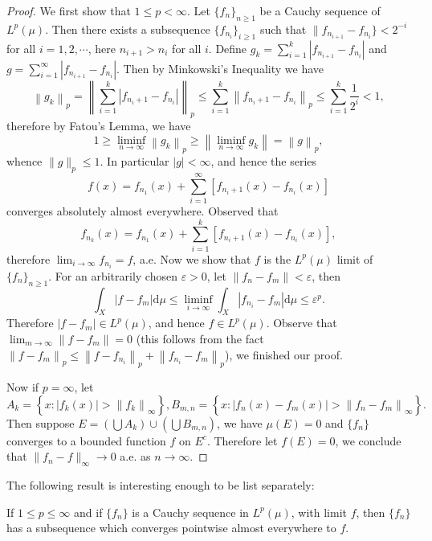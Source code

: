 \begin{proof}
We first show that $1\le p<\infty$. Let $\{f_n\}_{n\ge 1}$ be a Cauchy sequence of $L^p(\mu)$. Then there exists a subsequence $\{f_{n_i}\}_{i\ge 1}$ such that $\|f_{n_{i+1}}-f_{n_i}\}<2^{-i}$ for all $i=1,2,\cdots$, here $n_{i+1}>n_i$ for all $i$. Define $g_k=\sum_{i=1}^k|f_{n_{i+1}}-f_{n_i}|$ and $g=\sum_{i=1}^\infty|f_{n_{i+1}}-f_{n_i}|$. Then by Minkowski's Inequality we have 
$$
\left\| g_k \right\| _p=\left\| \sum_{i=1}^k{\left| f_{n_i+1}-f_{n_i} \right|} \right\| _p\le \sum_{i=1}^k{\left\| f_{n_i+1}-f_{n_i} \right\| _p}\le \sum_{i=1}^k{\frac{1}{2^i}}<1,
$$
therefore by Fatou's Lemma, we have 
$$
1\ge \mathop {\lim\mathrm{inf}} \limits_{n\rightarrow \infty}\left\| g_k \right\| _p\ge \left\| \mathop {\lim\mathrm{inf}} \limits_{n\rightarrow \infty}g_k \right\| =\left\| g \right\| _p,
$$
whence $\|g\|_p\le 1$. In particular $|g|<\infty$, and hence the series 
$$
f\left( x \right) =f_{n_1}\left( x \right) +\sum_{i=1}^{\infty}{\left[ f_{n_i+1}\left( x \right) -f_{n_i}\left( x \right) \right]}
$$
converges absolutely almost everywhere. Observed that 
$$
f_{n_k}\left( x \right) =f_{n_1}\left( x \right) +\sum_{i=1}^k{\left[ f_{n_i+1}\left( x \right) -f_{n_i}\left( x \right) \right]},
$$
therefore $\lim_{i\to\infty}f_{n_i}=f$, a.e. Now we show that $f$ is the $L^p(\mu)$ limit of $\{f_n\}_{n\ge 1}$. For an arbitrarily chosen $\varepsilon>0$, let $\|f_n-f_m\|<\varepsilon$, then 
$$
\int_X{\left| f-f_m \right|\mathrm{d}\mu}\le \mathop {\lim\mathrm{inf}} \limits_{i\rightarrow \infty}\int_X{\left| f_{n_i}-f_m \right|\mathrm{d}\mu}\le \varepsilon ^p.
$$
Therefore $|f-f_m|\in L^p(\mu)$, and hence $f\in L^p(\mu)$. Observe that $\lim_{m\rightarrow \infty} \left\| f-f_m \right\| =0$ (this follows from the fact $\left\| f-f_m \right\|_p \le \left\| f-f_{n_i} \right\|_p +\left\| f_{n_i}-f_m \right\|_p $), we finished our proof.\par
Now if $p=\infty$, let 
$$
A_k=\left\{ x:\left| f_k\left( x \right) \right|>\left\| f_k \right\| _{\infty} \right\} ,B_{m,n}=\left\{ x:\left| f_n\left( x \right) -f_m\left( x \right) \right|>\left\| f_n-f_m \right\| _{\infty} \right\} .
$$
Then suppose $E=\left( \bigcup{A_k} \right) \cup \left( \bigcup{B_{m,n}} \right) $, we have $\mu(E)=0$ and $\{f_n\}$ converges to a bounded function $f$ on $E^c$. Therefore let $f(E)=0$, we conclude that $\|f_n-f\|_\infty\to 0$ a.e. as $n\to\infty$.
\end{proof}
The following result is interesting enough to be list separately:
\begin{theorem}
If $1\le p\le\infty$ and if $\{f_n\}$ is a Cauchy sequence in $L^p(\mu)$, with limit $f$, then $\{f_n\}$ has a subsequence which converges pointwise almost everywhere to $f$.
\end{theorem}
